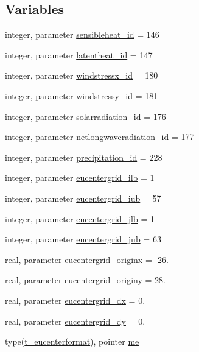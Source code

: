 \subsection*{Variables}
\begin{DoxyCompactItemize}
\item 
integer, parameter \mbox{\hyperlink{namespacemoduleeucenterformat_a438f4f3e96330053b7da9b6589cdb1b1}{sensibleheat\+\_\+id}} = 146
\item 
integer, parameter \mbox{\hyperlink{namespacemoduleeucenterformat_a8c61f64f48e54138b77142afd78c1dae}{latentheat\+\_\+id}} = 147
\item 
integer, parameter \mbox{\hyperlink{namespacemoduleeucenterformat_a156281fa4c18e658c6e7fc64f2ca840f}{windstressx\+\_\+id}} = 180
\item 
integer, parameter \mbox{\hyperlink{namespacemoduleeucenterformat_a40a3439722e2c27c4b9da1d86092f2df}{windstressy\+\_\+id}} = 181
\item 
integer, parameter \mbox{\hyperlink{namespacemoduleeucenterformat_ad5a7d7a3c2b26c8a8ae22d72818f99f3}{solarradiation\+\_\+id}} = 176
\item 
integer, parameter \mbox{\hyperlink{namespacemoduleeucenterformat_a9eaba21c58411b29c7b8cbfe51d9cefd}{netlongwaveradiation\+\_\+id}} = 177
\item 
integer, parameter \mbox{\hyperlink{namespacemoduleeucenterformat_a5814ea5a0ff165440641669008777f19}{precipitation\+\_\+id}} = 228
\item 
integer, parameter \mbox{\hyperlink{namespacemoduleeucenterformat_a36fad08856d94964af3ea808f3fdebf4}{eucentergrid\+\_\+ilb}} = 1
\item 
integer, parameter \mbox{\hyperlink{namespacemoduleeucenterformat_a88ae7517d7855a19bb1fed4e1e708767}{eucentergrid\+\_\+iub}} = 57
\item 
integer, parameter \mbox{\hyperlink{namespacemoduleeucenterformat_a9b0881ac83f9cca422a542537aaeb53a}{eucentergrid\+\_\+jlb}} = 1
\item 
integer, parameter \mbox{\hyperlink{namespacemoduleeucenterformat_aff046230f1fcd04f274110f84e333c6f}{eucentergrid\+\_\+jub}} = 63
\item 
real, parameter \mbox{\hyperlink{namespacemoduleeucenterformat_abd879d2be92c03d9212bb22be0121c3e}{eucentergrid\+\_\+originx}} = -\/26.
\item 
real, parameter \mbox{\hyperlink{namespacemoduleeucenterformat_a0778dd1978cdcbf2440b4aa474a4fc92}{eucentergrid\+\_\+originy}} = 28.
\item 
real, parameter \mbox{\hyperlink{namespacemoduleeucenterformat_a1c74f962a44ee07106d22d1e98574c70}{eucentergrid\+\_\+dx}} = 0.
\item 
real, parameter \mbox{\hyperlink{namespacemoduleeucenterformat_a6a30a645063a9c1400529d6c9dacd3ee}{eucentergrid\+\_\+dy}} = 0.
\item 
type(\mbox{\hyperlink{structmoduleeucenterformat_1_1t__eucenterformat}{t\+\_\+eucenterformat}}), pointer \mbox{\hyperlink{namespacemoduleeucenterformat_a0cbd535d243404d937ef121278618692}{me}}
\end{DoxyCompactItemize}


